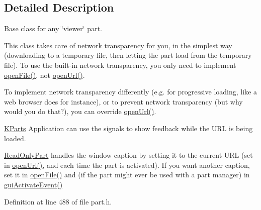 \subsection{\-Detailed \-Description}
\-Base class for any \char`\"{}viewer\char`\"{} part.

\-This class takes care of network transparency for you, in the simplest way (downloading to a temporary file, then letting the part load from the temporary file). \-To use the built-\/in network transparency, you only need to implement \hyperlink{classKParts_1_1ReadOnlyPart_a951a032497fb94b092dfd4fd134db09b}{open\-File()}, not \hyperlink{classKParts_1_1ReadOnlyPart_a1ff41b28f8da57ccc380e0c092a50c0c}{open\-Url()}.

\-To implement network transparency differently (e.\-g. for progressive loading, like a web browser does for instance), or to prevent network transparency (but why would you do that?), you can override \hyperlink{classKParts_1_1ReadOnlyPart_a1ff41b28f8da57ccc380e0c092a50c0c}{open\-Url()}.

\hyperlink{namespaceKParts}{\-K\-Parts} \-Application can use the signals to show feedback while the \-U\-R\-L is being loaded.

\hyperlink{classKParts_1_1ReadOnlyPart}{\-Read\-Only\-Part} handles the window caption by setting it to the current \-U\-R\-L (set in \hyperlink{classKParts_1_1ReadOnlyPart_a1ff41b28f8da57ccc380e0c092a50c0c}{open\-Url()}, and each time the part is activated). \-If you want another caption, set it in \hyperlink{classKParts_1_1ReadOnlyPart_a951a032497fb94b092dfd4fd134db09b}{open\-File()} and (if the part might ever be used with a part manager) in \hyperlink{classKParts_1_1ReadOnlyPart_aa5ac9f161aef38a92bbf25891746cac0}{gui\-Activate\-Event()} 

\-Definition at line 488 of file part.\-h.



